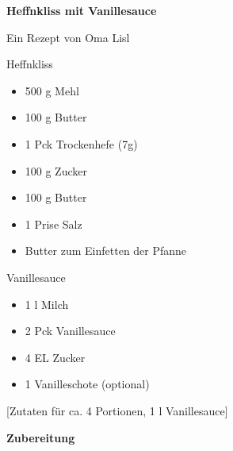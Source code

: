 

\parindent0pt	

\pagestyle{empty}


\textbf{{\LARGE Heffnkliss mit Vanillesauce}}%


\hrulefill

Ein Rezept von Oma Lisl
\vspace*{\fill}

\begin{multicols}{2}	


Heffnkliss
\begin{itemize}
\item 500 g Mehl
\item 100 g Butter
\item 1 Pck Trockenhefe (7g)
\item 100 g Zucker
\item 100 g Butter
\item 1 Prise Salz
\item Butter zum Einfetten der Pfanne
\end{itemize}
\vfill									%
\columnbreak								%
Vanillesauce
\begin{itemize}
\item 1 l Milch
\item 2 Pck Vanillesauce
\item 4 EL Zucker
\item 1 Vanilleschote (optional)
\end{itemize}
\end{multicols}

\vspace{1cm}			%
\begin{center}			%
[Zutaten für ca. 4 Portionen, 1 l Vanillesauce]%
\end{center}


\vfill
\newpage
\textbf{{\LARGE Zubereitung}}%

\hrulefill

